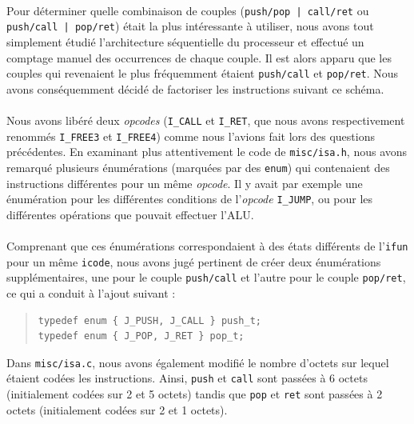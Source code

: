\documentclass[12pt]{article}
\begin{document}
\paragraph{}Pour déterminer quelle combinaison de couples (\verb+push/pop | call/ret+ ou \verb+push/call | pop/ret+) était la plus intéressante à utiliser, nous avons tout simplement étudié l'architecture séquentielle du processeur et effectué un comptage manuel des occurrences de chaque couple. Il est alors apparu que les couples qui revenaient le plus fréquemment étaient \verb+push/call+ et \verb+pop/ret+. Nous avons conséquemment décidé de factoriser les instructions suivant ce schéma.

\paragraph{}Nous avons libéré deux {\itshape opcodes} (\verb+I_CALL+ et \verb+I_RET+, que nous avons respectivement renommés \verb+I_FREE3+ et \verb+I_FREE4+) comme nous l'avions fait lors des questions précédentes. En examinant plus attentivement le code de \verb+misc/isa.h+, nous avons remarqué plusieurs énumérations (marquées par des \verb+enum+) qui contenaient des instructions différentes pour un même {\itshape opcode}. Il y avait par exemple une énumération pour les différentes conditions de l'{\itshape opcode} \verb+I_JUMP+, ou pour les différentes opérations que pouvait effectuer l'ALU. 

\paragraph{}Comprenant que ces énumérations correspondaient à des états différents de l'\verb+ifun+ pour un même \verb+icode+, nous avons jugé pertinent de créer deux énumérations supplémentaires, une pour le couple \verb+push/call+ et l'autre pour le couple \verb+pop/ret+, ce qui a conduit à l'ajout suivant :
\begin{quote}
\begin{verbatim}
typedef enum { J_PUSH, J_CALL } push_t;
typedef enum { J_POP, J_RET } pop_t;
\end{verbatim}
\end{quote}
Dans \verb+misc/isa.c+, nous avons également modifié le nombre d'octets sur lequel étaient codées les instructions. Ainsi, \verb+push+ et \verb+call+ sont passées à 6 octets (initialement codées sur 2 et 5 octets) tandis que \verb+pop+ et \verb+ret+ sont passées à 2 octets (initialement codées sur 2 et 1 octets).
\end{document}
